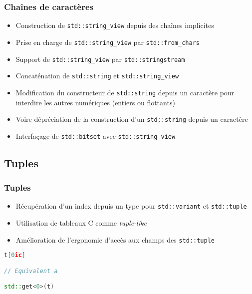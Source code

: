 \documentclass[C++.tex]{subfiles}
\begin{document}
\begin{frame}[fragile]
	\frametitle{Chaînes de caractères}
	\begin{itemize}
		\item Construction de \lstinline|std::string_view| depuis des chaînes implicites
		\item Prise en charge de \lstinline|std::string_view| par \lstinline|std::from_chars|
		\item Support de \lstinline|std::string_view| par \lstinline|std::stringstream|
		\item Concaténation de \lstinline|std::string| et \lstinline|std::string_view|
		\item Modification du constructeur de \lstinline|std::string| depuis un caractère pour interdire les autres numériques (entiers ou flottants)


		\item Voire dépréciation de la construction d'un \lstinline|std::string| depuis un caractère
		\item Interfaçage de \lstinline|std::bitset| avec \lstinline|std::string_view|
	\end{itemize}
\end{frame}

\subsection*{Tuples}
\begin{frame}[fragile]
	\frametitle{Tuples}
	\begin{itemize}
		\item Récupération d'un index depuis un type pour \lstinline|std::variant| et \lstinline|std::tuple|
		\item Utilisation de tableaux C comme \textit{tuple-like}


		\item Amélioration de l'ergonomie d'accès aux champs des \lstinline|std::tuple|
	\end{itemize}

	\begin{lstlisting}[language=C++]
t[0ic]

// Equivalent a

std::get<0>(t)\end{lstlisting}
\end{frame}
\end{document}

